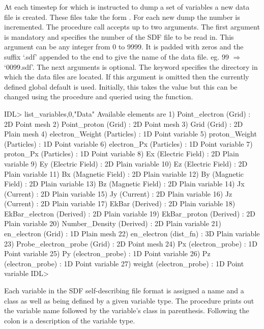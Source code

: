   At each timestep for which {\EPOCH} is instructed to dump a set of variables a
  new data file is created. These files take the form . For
  each new dump the number is incremented.
  The procedure call accepts up to two arguments. The first argument is
  mandatory and specifies the number of the SDF file to be read in.
  This argument can be any integer from 0 to 9999.
  It is padded with zeros and the
  suffix `.sdf' appended to the end to give the name of the data file.
  eg. 99 $\Rightarrow$ `0099.sdf'. The next arguments is optional.
  The keyword  specifies the directory in which the data files
  are located. If this argument is omitted then the currently defined global
  default is used. Initially, this takes the value  but this can
  be changed using the  procedure and queried using the
   function.

\begin{boxverbatim}
IDL> list_variables,0,"Data"
Available elements are
1) Point_electron (Grid) : 2D Point mesh
2) Point_proton (Grid) : 2D Point mesh
3) Grid (Grid) : 2D Plain mesh
4) electron_Weight (Particles) : 1D Point variable
5) proton_Weight (Particles) : 1D Point variable
6) electron_Px (Particles) : 1D Point variable
7) proton_Px (Particles) : 1D Point variable
8) Ex (Electric Field) : 2D Plain variable
9) Ey (Electric Field) : 2D Plain variable
10) Ez (Electric Field) : 2D Plain variable
11) Bx (Magnetic Field) : 2D Plain variable
12) By (Magnetic Field) : 2D Plain variable
13) Bz (Magnetic Field) : 2D Plain variable
14) Jx (Current) : 2D Plain variable
15) Jy (Current) : 2D Plain variable
16) Jz (Current) : 2D Plain variable
17) EkBar (Derived) : 2D Plain variable
18) EkBar_electron (Derived) : 2D Plain variable
19) EkBar_proton (Derived) : 2D Plain variable
20) Number_Density (Derived) : 2D Plain variable
21) en_electron (Grid) : 1D Plain mesh
22) en_electron (dist_fn) : 3D Plain variable
23) Probe_electron_probe (Grid) : 2D Point mesh
24) Px (electron_probe) : 1D Point variable
25) Py (electron_probe) : 1D Point variable
26) Pz (electron_probe) : 1D Point variable
27) weight (electron_probe) : 1D Point variable
IDL>
\end{boxverbatim}

  Each variable in the SDF self-describing file format is assigned a
  name and a class as well as being defined by a given variable type.
  The  procedure prints out the variable name followed
  by the variable's class in parenthesis. Following the colon is a
  description of the variable type.

